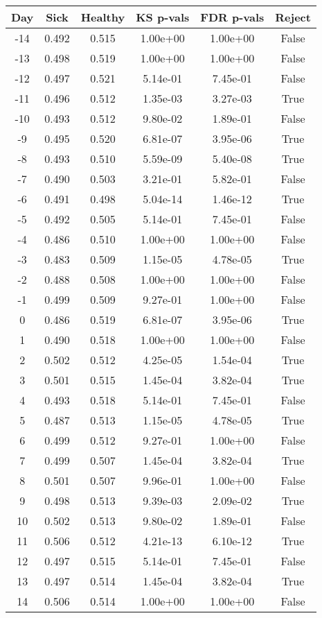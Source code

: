 \begin{tabular}{c|c|c|c|c|c}
Day &  Sick & Healthy &  KS p-vals & FDR p-vals & Reject\\
\hline
-14 & 0.492 &   0.515 &   1.00e+00 &   1.00e+00 &  False\\
-13 & 0.498 &   0.519 &   1.00e+00 &   1.00e+00 &  False\\
-12 & 0.497 &   0.521 &   5.14e-01 &   7.45e-01 &  False\\
-11 & 0.496 &   0.512 &   1.35e-03 &   3.27e-03 &   True\\
-10 & 0.493 &   0.512 &   9.80e-02 &   1.89e-01 &  False\\
 -9 & 0.495 &   0.520 &   6.81e-07 &   3.95e-06 &   True\\
 -8 & 0.493 &   0.510 &   5.59e-09 &   5.40e-08 &   True\\
 -7 & 0.490 &   0.503 &   3.21e-01 &   5.82e-01 &  False\\
 -6 & 0.491 &   0.498 &   5.04e-14 &   1.46e-12 &   True\\
 -5 & 0.492 &   0.505 &   5.14e-01 &   7.45e-01 &  False\\
 -4 & 0.486 &   0.510 &   1.00e+00 &   1.00e+00 &  False\\
 -3 & 0.483 &   0.509 &   1.15e-05 &   4.78e-05 &   True\\
 -2 & 0.488 &   0.508 &   1.00e+00 &   1.00e+00 &  False\\
 -1 & 0.499 &   0.509 &   9.27e-01 &   1.00e+00 &  False\\
  0 & 0.486 &   0.519 &   6.81e-07 &   3.95e-06 &   True\\
  1 & 0.490 &   0.518 &   1.00e+00 &   1.00e+00 &  False\\
  2 & 0.502 &   0.512 &   4.25e-05 &   1.54e-04 &   True\\
  3 & 0.501 &   0.515 &   1.45e-04 &   3.82e-04 &   True\\
  4 & 0.493 &   0.518 &   5.14e-01 &   7.45e-01 &  False\\
  5 & 0.487 &   0.513 &   1.15e-05 &   4.78e-05 &   True\\
  6 & 0.499 &   0.512 &   9.27e-01 &   1.00e+00 &  False\\
  7 & 0.499 &   0.507 &   1.45e-04 &   3.82e-04 &   True\\
  8 & 0.501 &   0.507 &   9.96e-01 &   1.00e+00 &  False\\
  9 & 0.498 &   0.513 &   9.39e-03 &   2.09e-02 &   True\\
 10 & 0.502 &   0.513 &   9.80e-02 &   1.89e-01 &  False\\
 11 & 0.506 &   0.512 &   4.21e-13 &   6.10e-12 &   True\\
 12 & 0.497 &   0.515 &   5.14e-01 &   7.45e-01 &  False\\
 13 & 0.497 &   0.514 &   1.45e-04 &   3.82e-04 &   True\\
 14 & 0.506 &   0.514 &   1.00e+00 &   1.00e+00 &  False\\
\end{tabular}